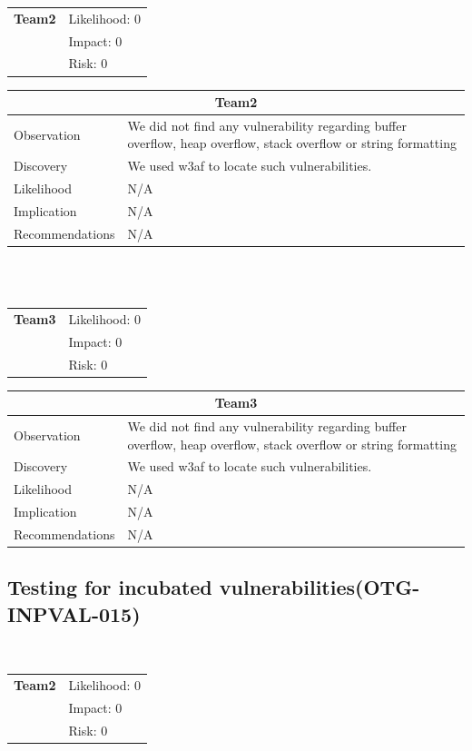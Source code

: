 \documentclass[headsepline,footsepline,footinclude=false,oneside,fontsize=11pt,paper=a4,listof=totoc,bibliography=totoc]{scrbook} %
\begin{document}
\begin{tabular}{cR{12cm}}
	\textbf{Team2} & Likelihood: 0\\& Impact: 0\\& Risk: 0
\end{tabular}

\begin{tabular}{ l|p{11cm}  }
	\hline
	\multicolumn{2}{c}{\textbf{Team2}} \\
	\hline
	Observation   & We did not find any vulnerability regarding buffer overflow,
	heap overflow, stack overflow or string formatting\\
	Discovery  & We used w3af to locate such vulnerabilities. \\
	Likelihood & N/A \\
	Implication    & N/A \\
	Recommendations & N/A \\ 
	\hline
\end{tabular}
\\
\vspace{0.5cm}
\\
\begin{tabular}{cR{12cm}}
	\textbf{Team3} & Likelihood: 0\\& Impact: 0\\& Risk: 0
\end{tabular}

\begin{tabular}{ l|p{11cm}  }
	\hline
	\multicolumn{2}{c}{\textbf{Team3}} \\
	\hline
	Observation   & We did not find any vulnerability regarding buffer overflow,
	heap overflow, stack overflow or string formatting\\
	Discovery  & We used w3af to locate such vulnerabilities. \\
	Likelihood & N/A \\
	Implication    & N/A \\
	Recommendations & N/A \\ 
	\hline
\end{tabular}
\pagebreak
\subsection{Testing for incubated vulnerabilities(OTG-INPVAL-015)}\

\begin{tabular}{cR{12cm}}
	\textbf{Team2} & Likelihood: 0\\& Impact: 0\\& Risk: 0
\end{tabular}
\end{document}
